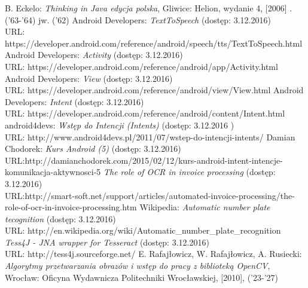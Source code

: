 \documentclass[eng,oneside]{mgr}
\begin{document}
\begin{thebibliography}{99}
 B. Eckelo: \emph{Thinking in Java edycja polska}, Gliwice: Helion, wydanie 4, [2006] .  ('63-'64)
 jw. ('62)
 Android Developers: \emph{TextToSpeech} (dostęp: 3.12.2016) \\
URL: https://developer.android.com/reference/android/speech/tts/TextToSpeech.html
 Android Developers: \emph{Activity} (dostęp: 3.12.2016) \\
URL: https://developer.android.com/reference/android/app/Activity.html
 Android Developers: \emph{View} (dostęp: 3.12.2016) \\
URL: https://developer.android.com/reference/android/view/View.html
 Android Developers: \emph{Intent} (dostęp: 3.12.2016) \\
URL: https://developer.android.com/reference/android/content/Intent.html
 android4devs: \emph{Wstęp do Intencji (Intents)} (dostęp: 3.12.2016 ) \\
URL: http://www.android4devs.pl/2011/07/wstep-do-intencji-intents/
 Damian Chodorek: \emph{Kurs Android (5)} (dostęp: 3.12.2016) \\
URL:\hspace{0.1cm}http://damianchodorek.com/2015/02/12/kurs-android-intent-intencje-komunikacja-aktywnosci-5
 \emph{The role of OCR in invoice processing} (dostęp: 3.12.2016) \\
URL:\hspace{0.1cm}http://smart-soft.net/support/articles/automated-invoice-processing/the-role-of-ocr-in-invoice-processing.htm
 Wikipedia: \emph{Automatic number plate tecognition} (dostęp: 3.12.2016) \\
URL: http://en.wikipedia.org/wiki/Automatic\_number\_plate\_recognition
 \emph {Tess4J - JNA wrapper for Tesseract} (dostęp: 3.12.2016)\\
URL: http://tess4j.sourceforge.net/
 E. Rafajłowicz, W. Rafajłowicz, A. Rusiecki: \emph{Algorytmy przetwarzania obrazów i wstęp do pracy z biblioteką OpenCV}, Wrocław: Oficyna Wydawnicza Politechniki Wrocławskiej, [2010], ('23-'27)

\end{thebibliography}
\end{document}
